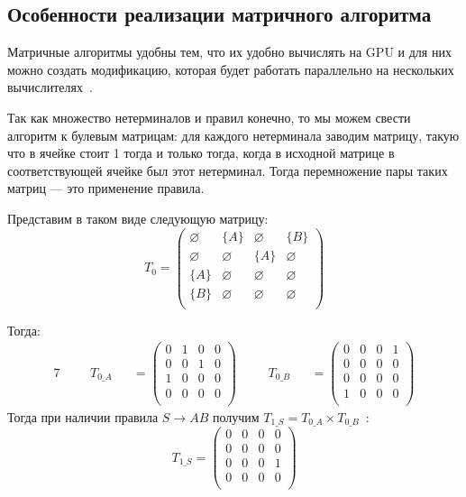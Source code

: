 \subsection{Особенности реализации матричного алгоритма}

Матричные алгоритмы удобны тем, что их удобно вычислять на GPU и для них можно создать модификацию, которая будет работать параллельно на нескольких вычислителях~\cite{Mishin:2019:ECP:3327964.3328503}.

Так как множество нетерминалов и правил конечно, то мы можем свести алгоритм к булевым матрицам: для каждого нетерминала заводим матрицу, такую что в ячейке стоит 1 тогда и только тогда, когда в исходной матрице в соответствующей ячейке был этот нетерминал.
Тогда перемножение пары таких матриц --- это применение правила.


\begin{example}
Представим в таком виде следующую матрицу:
\[
T_0 = \begin{pmatrix}
\varnothing & \{A\}       & \varnothing & \{B\}       \\
\varnothing & \varnothing & \{A\}       & \varnothing \\
\{A\}       & \varnothing & \varnothing & \varnothing \\
\{B\}       & \varnothing & \varnothing & \varnothing \\
\end{pmatrix}
\]

Тогда:
\begin{alignat*}{7}
& &&T_{0\_A} &&= \begin{pmatrix}
0 & 1       & 0 & 0       \\
0 & 0 & 1       & 0 \\
1  & 0 & 0 & 0       \\
0       & 0 & 0 & 0 \\
\end{pmatrix} \ \ \ \ &&T_{0\_B} &&= \begin{pmatrix}
0 & 0       & 0 & 1       \\
0       & 0 & 0       & 0 \\
0  & 0 & 0 & 0       \\
1       & 0 & 0 & 0 \\
\end{pmatrix}
\end{alignat*}
Тогда при наличии правила $S \to A B$ получим $T_{1\_S} =T_{0\_A} \times T_{0\_B}$~:
\[
T_{1\_S} = \begin{pmatrix}
0 & 0       & 0 & 0       \\
0       & 0 & 0       & 0 \\
0  & 0 & 0 & 1       \\
0       & 0 & 0 & 0 \\
\end{pmatrix}
\]
\end{example}

